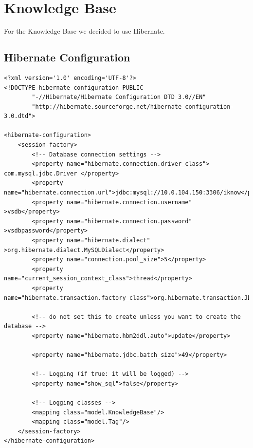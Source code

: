 \documentclass[12pt]{article}
\begin{document}
\section{Knowledge Base}
For the Knowledge Base we decided to use Hibernate.
\subsection{Hibernate Configuration}
\begin{lstlisting}[caption=hibernate config xml (hibernate.cfg.xml) entity class, label=hibconf]
<?xml version='1.0' encoding='UTF-8'?>
<!DOCTYPE hibernate-configuration PUBLIC
        "-//Hibernate/Hibernate Configuration DTD 3.0//EN"
        "http://hibernate.sourceforge.net/hibernate-configuration-3.0.dtd">

<hibernate-configuration>
	<session-factory>
		<!-- Database connection settings -->
 		<property name="hibernate.connection.driver_class"> com.mysql.jdbc.Driver </property>
 		<property name="hibernate.connection.url">jdbc:mysql://10.0.104.150:3306/iknow</property>
		<property name="hibernate.connection.username" >vsdb</property>
		<property name="hibernate.connection.password" >vsdbpassword</property>
		<property name="hibernate.dialect" >org.hibernate.dialect.MySQLDialect</property>	
		<property name="connection.pool_size">5</property>
		<property name="current_session_context_class">thread</property>
		<property name="hibernate.transaction.factory_class">org.hibernate.transaction.JDBCTransactionFactory</property>
		
		<!-- do not set this to create unless you want to create the database -->
		<property name="hibernate.hbm2ddl.auto">update</property>

		<property name="hibernate.jdbc.batch_size">49</property>

		<!-- Logging (if true: it will be logged) -->
		<property name="show_sql">false</property>
		
		<!-- Logging classes -->
		<mapping class="model.KnowledgeBase"/>
		<mapping class="model.Tag"/>
	</session-factory>
</hibernate-configuration>

\end{lstlisting}
\end{document}
